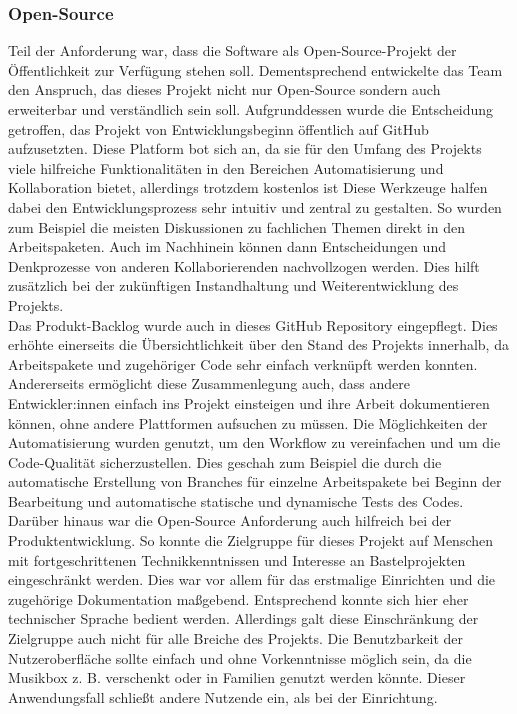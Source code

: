 \documentclass[10pt, a4paper]{article}
\begin{document}
\subsubsection{Open-Source}
Teil der Anforderung war, dass die Software als Open-Source-Projekt der Öffentlichkeit zur Verfügung stehen soll.
Dementsprechend entwickelte das Team den Anspruch, das dieses Projekt nicht nur Open-Source sondern auch erweiterbar und verständlich sein soll.
Aufgrunddessen wurde die Entscheidung getroffen, das Projekt von Entwicklungsbeginn öffentlich auf GitHub aufzusetzten.
Diese Platform bot sich an, da sie für den Umfang des Projekts viele hilfreiche Funktionalitäten in den Bereichen Automatisierung und Kollaboration bietet, allerdings trotzdem kostenlos ist
Diese Werkzeuge halfen dabei den Entwicklungsprozess sehr intuitiv und zentral zu gestalten.
So wurden zum Beispiel die meisten Diskussionen zu fachlichen Themen direkt in den Arbeitspaketen.
Auch im Nachhinein können dann Entscheidungen und Denkprozesse von anderen Kollaborierenden nachvollzogen werden.
Dies hilft zusätzlich bei der zukünftigen Instandhaltung und Weiterentwicklung des Projekts.
\\
Das Produkt-Backlog wurde auch in dieses GitHub Repository eingepflegt.
Dies erhöhte einerseits die Übersichtlichkeit über den Stand des Projekts innerhalb, da Arbeitspakete und zugehöriger Code sehr einfach verknüpft werden konnten.
Andererseits ermöglicht diese Zusammenlegung auch, dass andere Entwickler:innen einfach ins Projekt einsteigen und ihre Arbeit dokumentieren können, ohne andere Plattformen aufsuchen zu müssen.
Die Möglichkeiten der Automatisierung wurden genutzt, um den Workflow zu vereinfachen und um die Code-Qualität sicherzustellen.
Dies geschah zum Beispiel die durch die automatische Erstellung von Branches für einzelne Arbeitspakete bei Beginn der Bearbeitung und automatische statische und dynamische Tests des Codes.
\\
Darüber hinaus war die Open-Source Anforderung auch hilfreich bei der Produktentwicklung.
So konnte die Zielgruppe für dieses Projekt auf Menschen mit fortgeschrittenen Technikkenntnissen und Interesse an Bastelprojekten eingeschränkt werden.
Dies war vor allem für das erstmalige Einrichten und die zugehörige Dokumentation maßgebend.
Entsprechend konnte sich hier eher technischer Sprache bedient werden.
Allerdings galt diese Einschränkung der Zielgruppe auch nicht für alle Breiche des Projekts.
Die Benutzbarkeit der Nutzeroberfläche sollte einfach und ohne Vorkenntnisse möglich sein, da die Musikbox z. B. verschenkt oder in Familien genutzt werden könnte.
Dieser Anwendungsfall schließt andere Nutzende ein, als bei der Einrichtung.
\end{document}

